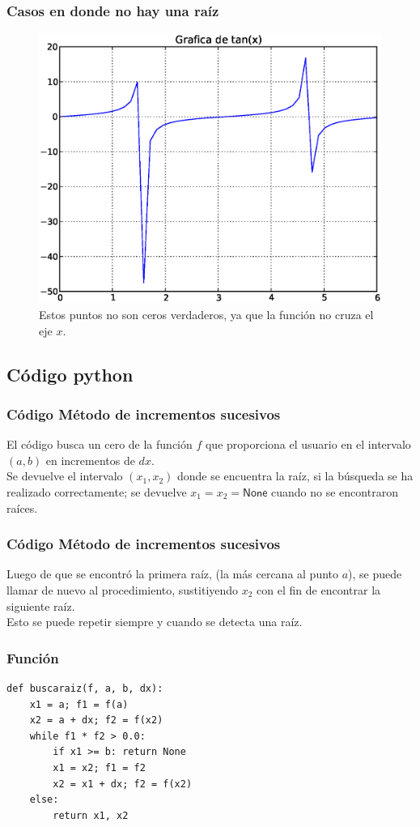 \documentclass[12pt]{beamer}
\begin{document}
\begin{frame}
\frametitle{Casos en donde no hay una raíz}
\begin{figure}
	\centering
	\includegraphics[scale=0.4]{Imagenes/raices05.eps}
	\caption{Estos puntos no son ceros verdaderos, ya que la función no cruza el eje $x$.}
\end{figure}
\end{frame}

\subsection{Código python}

\begin{frame}
\frametitle{Código Método de incrementos sucesivos}
El código busca un cero de la función $f$ que proporciona el usuario en el intervalo
$(a, b)$ en incrementos de $dx$.
\\
\bigskip
\pause
Se devuelve el intervalo $(x_{1}, x_{2})$ donde se encuentra la raíz, si la búsqueda
se ha realizado correctamente; se devuelve $x_{1} = x_{2} = \mathsf{None}$ cuando no se encontraron raíces.
\end{frame}
\begin{frame}
\frametitle{Código Método de incrementos sucesivos}
Luego de que se encontró la primera raíz, (la más cercana al punto $a$), se puede llamar de nuevo al procedimiento, sustitiyendo $x_{2}$ con el fin de encontrar la siguiente raíz. 
\\
\bigskip
\pause
Esto se puede repetir siempre y cuando se detecta una raíz.
\end{frame}
\begin{frame}[fragile]
\frametitle{Función }
\begin{lstlisting}[caption=Función buscaraiz para encontrar un intervalo que contiene una raíz]
def buscaraiz(f, a, b, dx):
    x1 = a; f1 = f(a)
    x2 = a + dx; f2 = f(x2)
    while f1 * f2 > 0.0:
        if x1 >= b: return None
        x1 = x2; f1 = f2
        x2 = x1 + dx; f2 = f(x2)
    else:
        return x1, x2
\end{lstlisting}
\end{frame}
\end{document}
